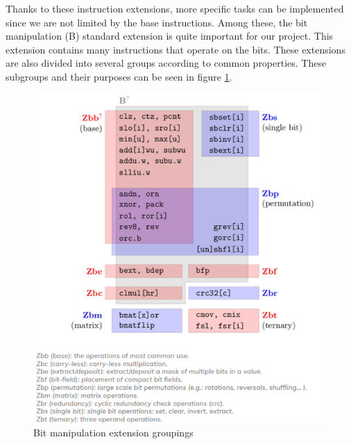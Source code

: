 Thanks to these instruction extensions, more specific tasks can be implemented since we are not limited by the base instructions.
Among these, the bit manipulation (B) standard extension is quite important for our project. This extension contains many instructions that operate on the bits. These extensions are also divided into several groups according to common properties. These subgroups and their purposes can be seen in figure \ref{fig:bit_manipulation_extension_groupings}.
\begin{figure}[h!]
    \centering
    \includegraphics{riscv/bit_manipulation_extension_groupings.png}
    \caption{Bit manipulation extension groupings \cite{bitmanipgroups}}
    \label{fig:bit_manipulation_extension_groupings}
\end{figure}


